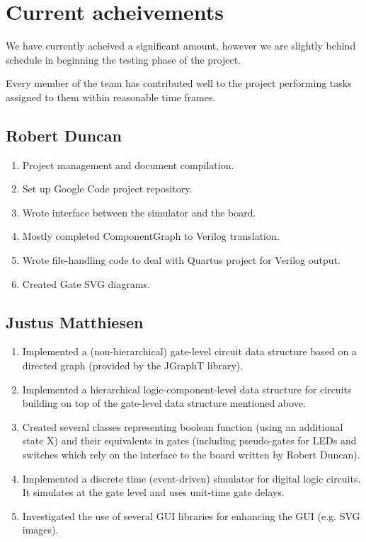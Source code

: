 \documentclass[12pt, a4paper, oneside,titlepage]{article}
\begin{document}
\section{Current acheivements}
We have currently acheived a significant amount, however we are slightly behind schedule in beginning the testing phase of the project. 

Every member of the team has contributed well to the project performing tasks assigned to them within reasonable time frames.
\subsection{Robert Duncan}
\begin{enumerate}
\item Project management and document compilation. 
\item Set up Google Code project repository.
\item Wrote interface between the simulator and the board.
\item Mostly completed ComponentGraph to Verilog translation. 
\item Wrote file-handling code to deal with Quartus project for Verilog output. 
\item Created Gate SVG diagrams.
\end{enumerate}
\subsection{Justus Matthiesen}
\begin{enumerate}
\item Implemented a (non-hierarchical) gate-level circuit data structure based on 
a directed graph (provided by the JGraphT library).
\item Implemented a hierarchical logic-component-level data structure for circuits 
building on top of the gate-level data structure mentioned above.
\item Created several classes representing boolean function (using an additional 
state X) and their equivalents in gates (including pseudo-gates for LEDs and 
switches which rely on the interface to the board written by Robert Duncan).
\item Implemented a discrete time (event-driven) simulator for digital logic 
circuits. It simulates at the gate level and uses unit-time gate delays.
\item Investigated the use of several GUI libraries for enhancing the GUI (e.g. 
SVG images).
\end{enumerate}
\end{document}
